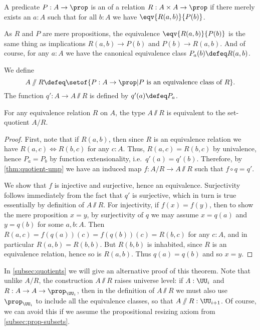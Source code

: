\begin{defn}
  A predicate $P:A\to\prop$ is an 
  of a relation $R : A \times A \to \prop$ if there merely exists an $a:A$ such that for all $b:A$ we have $\eqv{R(a,b)}{P(b)}$.
\end{defn}

As $R$ and $P$ are mere propositions, the equivalence $\eqv{R(a,b)}{P(b)}$ is the same thing as implications $R(a,b) \to P(b)$ and $P(b) \to R(a,b)$.
And of course, for any $a:A$ we have the canonical equivalence class $P_a(b) \defeq R(a,b)$.

\begin{defn}\label{def:VVquotient}
  We define
  \begin{equation*}
    A\sslash R \defeq \setof{ P:A\to\prop | P \text{ is an equivalence class of } R}.
  \end{equation*}
  The function $q':A\to A\sslash R$ is defined by $q'(a) \defeq P_a$.
\end{defn}

\begin{thm}
  For any equivalence relation $R$ on $A$, the type $A\sslash R$ is equivalent to the set-quotient $A/R$.
\end{thm}
\begin{proof}
  First, note that if $R(a,b)$, then since $R$ is an equivalence relation we have $R(a,c) \Leftrightarrow R(b,c)$ for any $c:A$.
  Thus, $R(a,c) = R(b,c)$ by univalence, hence $P_a=P_b$ by function extensionality, i.e.\ $q'(a)=q'(b)$.
  Therefore, by \cref{thm:quotient-ump} we have an induced map $f:A/R \to A\sslash R$ such that $f\circ q = q'$.

  We show that $f$ is injective and surjective, hence an equivalence.
  Surjectivity follows immediately from the fact that $q'$ is surjective, which in turn is true essentially by definition of $A\sslash R$.
  For injectivity, if $f(x)=f(y)$, then to show the mere proposition $x=y$, by surjectivity of $q$ we may assume $x=q(a)$ and $y=q(b)$ for some $a,b:A$.
  Then $R(a,c) = f(q(a))(c) = f(q(b))(c) = R(b,c)$ for any $c:A$, and in particular $R(a,b) = R(b,b)$.
  But $R(b,b)$ is inhabited, since $R$ is an equivalence relation, hence so is $R(a,b)$.
  Thus $q(a)=q(b)$ and so $x=y$.
\end{proof}

In \cref{subsec:quotients} we will give an alternative proof of this theorem.
Note that unlike $A/R$, the construction $A\sslash R$ raises universe level: if $A:\UU_i$ and $R:A\to A\to \prop_{\UU_i}$, then in the definition of $A\sslash R$ we must also use $\prop_{\UU_i}$ to include all the equivalence classes, so that $A\sslash R : \UU_{i+1}$.
Of course, we can avoid this if we assume the propositional resizing axiom from \cref{subsec:prop-subsets}.

